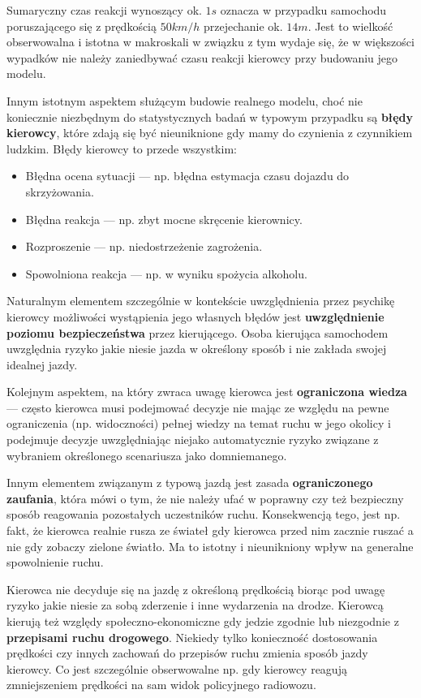 {\par{
Sumaryczny czas reakcji wynoszący ok. $1s$ oznacza w przypadku samochodu poruszającego się z prędkością $50km/h$ przejechanie ok. $14m$. Jest to wielkość obserwowalna i istotna w makroskali w związku z tym wydaje się, że w większości wypadków nie należy zaniedbywać czasu reakcji kierowcy przy budowaniu jego modelu.
}
\par{
Innym istotnym aspektem służącym budowie realnego modelu, choć nie koniecznie niezbędnym do statystycznych badań w typowym przypadku są \textbf{błędy kierowcy}, które zdają się być nieuniknione gdy mamy do czynienia z czynnikiem ludzkim. Błędy kierowcy to przede wszystkim:
\begin{itemize}
\renewcommand{\labelitemi}{$\bullet$}
\item Błędna ocena sytuacji --- np. błędna estymacja czasu dojazdu do skrzyżowania.
\item Błędna reakcja --- np. zbyt mocne skręcenie kierownicy.
\item Rozproszenie --- np. niedostrzeżenie zagrożenia.
\item Spowolniona reakcja --- np. w wyniku spożycia alkoholu.
\end{itemize}
}
\par{
Naturalnym elementem szczególnie w kontekście uwzględnienia przez psychikę kierowcy możliwości wystąpienia jego własnych błędów jest \textbf{uwzględnienie poziomu bezpieczeństwa} przez kierującego. Osoba kierująca samochodem uwzględnia ryzyko jakie niesie jazda w określony sposób i nie zakłada swojej idealnej jazdy.
}
\par{
Kolejnym aspektem, na który zwraca uwagę kierowca jest \textbf{ograniczona wiedza} --- często kierowca musi podejmować decyzje nie mając ze względu na pewne ograniczenia (np. widoczności) pełnej wiedzy na temat ruchu w jego okolicy i podejmuje decyzje uwzględniając niejako automatycznie ryzyko związane z wybraniem określonego scenariusza jako domniemanego.
}
\par{
Innym elementem związanym z typową jazdą jest zasada \textbf{ograniczonego zaufania}, która mówi o tym, że nie należy ufać w poprawny czy też bezpieczny sposób reagowania pozostałych uczestników ruchu. Konsekwencją tego, jest np. fakt, że kierowca realnie rusza ze świateł gdy kierowca przed nim zacznie ruszać a nie gdy zobaczy zielone światło. Ma to istotny i nieunikniony wpływ na generalne spowolnienie ruchu.
}
\par{
Kierowca nie decyduje się na jazdę z określoną prędkością biorąc pod uwagę ryzyko jakie niesie za sobą zderzenie i inne wydarzenia na drodze. Kierowcą kierują też względy społeczno-ekonomiczne gdy jedzie zgodnie lub niezgodnie z \textbf{przepisami ruchu drogowego}. Niekiedy tylko konieczność dostosowania prędkości czy innych zachowań do przepisów ruchu zmienia sposób jazdy kierowcy. Co jest szczególnie obserwowalne np. gdy kierowcy reagują zmniejszeniem prędkości na sam widok policyjnego radiowozu.
}}
